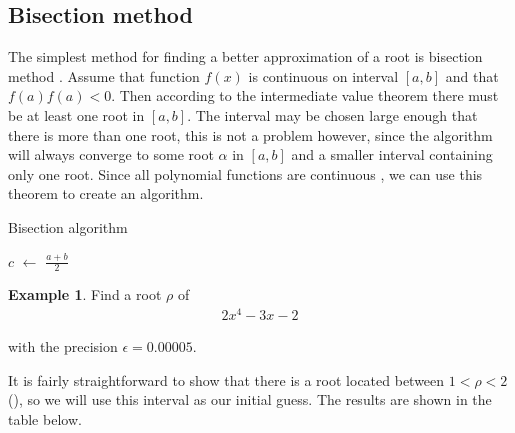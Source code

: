 \documentclass[
  digital, %
  table,   %
  nolof,     %
  nolot,     %
	draft, %
]{fithesis3}
\begin{document}
\subsection{Bisection method}
The simplest method for finding a better approximation of a root is bisection method \parencite{rootApproxMeth}. Assume that function $f(x)$ is continuous on interval $[a,b]$ and that $f(a)f(a) < 0$. Then according to the intermediate value theorem \parencite{interValue} there must be at least one root in $[a,b]$. The interval may be chosen large enough that there is more than one root, this is not a problem however, since the algorithm will always converge to some root $\alpha$ in $[a,b]$ and a smaller interval containing only one root. Since all polynomial functions are continuous \parencite{polyCont}, we can use this theorem to create an algorithm.

\newcommand*\Let[2]{\State #1 $\gets$ #2}
\algrenewcommand{}
\algrenewcommand{}
\begin{algorithm}
  \caption{Bisection algorithm
    \label{alg:bisect}}
  \begin{algorithmic}[1]
    \Statex
      \Let{$c$}{$\frac{a + b}{2}$}
			\EndIf
				\State {}
				\Else \State {}
			\EndIf
    \EndFunction
  \end{algorithmic}
\end{algorithm}

\theoremstyle{definition}
\newtheorem{example}{Example}[section]
\begin{example}
Find a root $\rho$ of 
\begin{align}
      2x^{4} - 3x - 2
\end{align}

with the precision $\epsilon = 0.00005$.
\end{example}

It is fairly straightforward to show that there is a root located between $1 < \rho < 2$ (), so we will use this interval as our initial guess. The results are shown in the table below.
\end{document}
